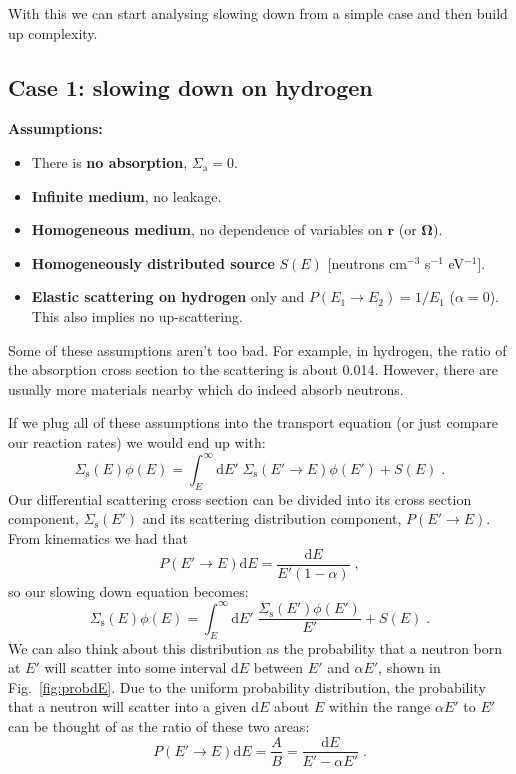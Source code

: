 With this we can start analysing slowing down from a  simple case and then build up complexity.

\subsection{Case 1: slowing down on hydrogen}
\textbf{Assumptions:}
\begin{itemize}
    \item There is \textbf{no absorption}, $\Sigma_\mathrm{a} = 0$.
    \item \textbf{Infinite medium}, no leakage.
    \item \textbf{Homogeneous medium}, no dependence of variables on $\mathbf{r}$ (or $\mathbf{\Omega}$).
    \item \textbf{Homogeneously distributed source} $S(E)$ [neutrons cm$^{-3}$ s$^{-1}$ eV$^{-1}$].
    \item \textbf{Elastic scattering on hydrogen} only and $P(E_1\rightarrow E_2) = 1/E_1$ ($\alpha = 0$). This also implies no up-scattering.
\end{itemize}
Some of these assumptions aren't too bad. For example, in hydrogen, the ratio of the absorption cross section to the scattering is about 0.014. However, there are usually more materials nearby which do indeed absorb neutrons.

If we plug all of these assumptions into the transport equation (or just compare our reaction rates) we would end up with:
\begin{equation}
    \Sigma_\mathrm{s}(E)\phi(E) = \int^{\infty}_E\mathrm{d}E'\;\Sigma_\mathrm{s}(E'\rightarrow E)\phi(E') + S(E)\;\mathrm{.}
\end{equation}
Our differential scattering cross section can be divided into its cross section component, $\Sigma_\mathrm{s}(E')$ and its scattering distribution component, $P(E'\rightarrow E)$. From kinematics we had that
\begin{equation*}
    P(E'\rightarrow E)\mathrm{d}E = \frac{\mathrm{d}E}{E'(1-\alpha)}\;\mathrm{,}
\end{equation*}
so our slowing down equation becomes:
\begin{equation*}
    \Sigma_\mathrm{s}(E)\phi(E) = \int^{\infty}_E\mathrm{d}E'\;\frac{\Sigma_\mathrm{s}(E')\phi(E')}{E'} + S(E)\;\mathrm{.}
\end{equation*}
We can also think about this distribution as the probability that a neutron born at $E'$ will scatter into some interval $\mathrm{d}E$ between $E'$ and $\alpha E'$, shown in Fig.~\ref{fig:probdE}. Due to the uniform probability distribution, the probability that a neutron will scatter into a given $\mathrm{d}E$ about $E$ within the range $\alpha E'$ to $E'$ can be thought of as the ratio of these two areas:
\begin{equation*}
    P(E'\rightarrow E)\mathrm{d}E = \frac{A}{B} = \frac{\mathrm{d}E}{E' - \alpha E'}\;\mathrm{.}
\end{equation*}

